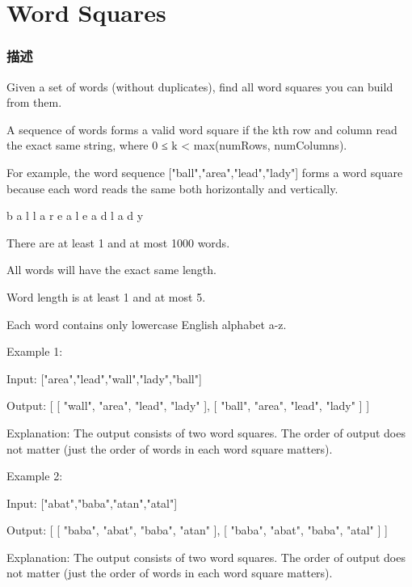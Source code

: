 \section{Word Squares} %
\label{sec:word-squares}


\subsubsection{描述}
Given a set of words (without duplicates), find all word squares you can build from them.

A sequence of words forms a valid word square if the kth row and column read the exact same string, where 0 ≤ k < max(numRows, numColumns).

For example, the word sequence ["ball","area","lead","lady"] forms a word square because each word reads the same both horizontally and vertically.


\begin{Code}
b a l l
a r e a
l e a d
l a d y
\end{Code}

\begindot
\item There are at least 1 and at most 1000 words.
\item All words will have the exact same length.
\item Word length is at least 1 and at most 5.
\item Each word contains only lowercase English alphabet a-z.
\myenddot

Example 1:
\begin{Code}
Input:
["area","lead","wall","lady","ball"]

Output:
[
  [ "wall",
    "area",
    "lead",
    "lady"
  ],
  [ "ball",
    "area",
    "lead",
    "lady"
  ]
]

Explanation:
The output consists of two word squares.
The order of output does not matter (just the order of words in each word square matters).
\end{Code}

Example 2:
\begin{Code}
Input:
["abat","baba","atan","atal"]

Output:
[
  [ "baba",
    "abat",
    "baba",
    "atan"
  ],
  [ "baba",
    "abat",
    "baba",
    "atal"
  ]
]

Explanation:
The output consists of two word squares.
The order of output does not matter (just the order of words in each word square matters).
\end{Code}
